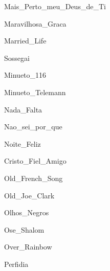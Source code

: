 \documentclass{scrartcl}
\begin{document}

{Mais_Perto_meu_Deus_de_Ti}


{Maravilhosa_Graca}


{Married_Life}


{Sossegai}


{Minueto_116}


{Minueto_Telemann}


{Nada_Falta}


{Nao_sei_por_que}


{Noite_Feliz}


{Cristo_Fiel_Amigo}


{Old_French_Song}


{Old_Joe_Clark}


{Olhos_Negros}


{Ose_Shalom}


{Over_Rainbow}


{Perfidia}
\end{document}
